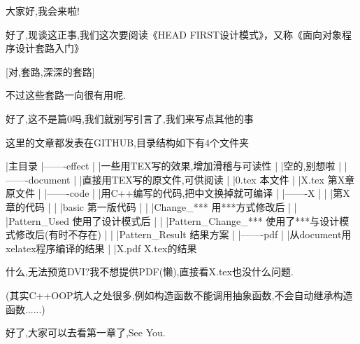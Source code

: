 \documentclass{article}
\def\enter{{\hfill\break}}
\begin{document}
大家好,我会来啦!

好了,现谈这正事,我们这次要阅读《HEAD FIRST设计模式》，又称《面向对象程序设计套路入门》

[对,套路,深深的套路]

不过这些套路一向很有用呢.

好了,这不是篇0吗,我们就别写引言了,我们来写点其他的事

这里的文章都发表在GITHUB,目录结构如下有4个文件夹

|主目录 \enter
|-------effect \enter
|       |一些用TEX写的效果,增加滑稽与可读性 \enter
|       |空的,别想啦 \enter
| \enter
|-------document \enter
|       |直接用TEX写的原文件,可供阅读 \enter
|       |0.tex 本文件 \enter
|	|X.tex 第X章原文件 \enter
| \enter
|-------code \enter
|       |用C++编写的代码,把中文换掉就可编译 \enter
|       |-------X \enter
|       |       |第X章的代码 \enter
|       |       |basic 第一版代码 \enter
|       |       |Change\_*** 用***方式修改后 \enter
|       |       |Pattern\_Used 使用了设计模式后 \enter
|       |       |Pattern\_Change\_*** 使用了***与设计模式修改后(有时不存在) \enter
|       |       |Pattern\_Result 结果方案 \enter
| \enter
|-------pdf \enter
|       |从document用xelatex程序编译的结果 \enter
|       |X.pdf X.tex的结果 \enter

什么,无法预览DVI?我不想提供PDF(懒),直接看X.tex也没什么问题.

(其实C++OOP坑人之处很多,例如构造函数不能调用抽象函数,不会自动继承构造函数......)

好了,大家可以去看第一章了,See You.
\end{document}

